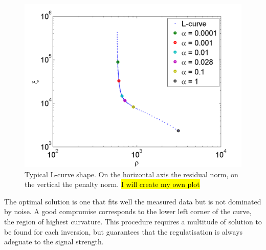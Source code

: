 \begin{figure}
	\centering
	\includegraphics[width=\linewidth]{Chapters/chapter2/figs/l-curve.png}
	\caption{Typical L-curve shape. On the horizontal axis the residual norm, on the vertical the penalty norm. \hl{I will create my own plot}}
	\label{fig:l-curve}
\end{figure}

The optimal solution is one that fits well the measured data but is not dominated by noise. A good compromise corresponds to the lower left corner of the curve, the region of highest curvature. This procedure requires a multitude of solution to be found for each inversion, but guarantees that the regulatisation is always adeguate to the signal strength.
